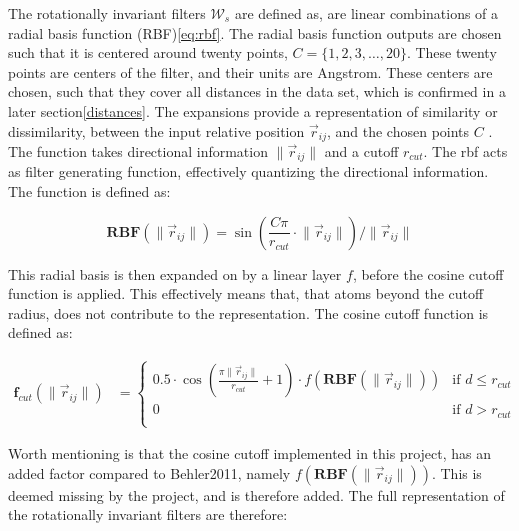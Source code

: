 The rotationally invariant filters $\mathcal{W}_{s}$ are defined as, are linear combinations of a radial basis function
(RBF)\ref{eq:rbf}\cite{Atz2021}. The radial basis function outputs are chosen such that it is centered around twenty
points, $ C = \{1, 2, 3, \ldots, 20\}$. These twenty points are centers of the filter, and their units are Angstrom.
These centers are chosen, such that they cover all distances in the data set, which is confirmed in a later section\ref{distances}.
The expansions provide a representation of similarity or dissimilarity, between the input relative position $\vec{r}_{ij}$,
and the chosen points $C$ \cite{rbf}.
The function takes directional information $\lVert \vec{r}_{ij} \rVert$ and a cutoff
$r_{cut}$. The rbf acts as filter generating function\cite{Schütt2017},
effectively quantizing the directional information. The function is defined as:

\begin{equation}\label{eq:rbf}
    \mathbf{RBF}(\lVert \vec{r}_{ij} \rVert) = \sin \left( \frac{C \pi}{r_{cut}} \cdot \lVert \vec{r}_{ij} \rVert  \right) / \lVert \vec{r}_{ij} \rVert
\end{equation}

This radial basis is then expanded on by a linear layer $f$, before the cosine cutoff function is applied. This effectively means that,
that atoms beyond the cutoff radius, does not contribute to the representation\cite{Behler2011}. The cosine cutoff function
is defined as:

\begin{equation}\label{eq:coscutoffproject}
    \begin{aligned}
        \mathbf{f}_{cut}(\lVert \vec{r}_{ij} \rVert) & =
        \begin{cases}
            0.5 \cdot \cos \left( \frac{\pi \lVert \vec{r}_{ij} \rVert}{r_{cut}} + 1  \right) \cdot f(\mathbf{RBF}(\lVert \vec{r}_{ij} \rVert)) & \text{if } d \leq r_{cut} \\
            0                                                                                                                                   & \text{if } d > r_{cut}    \\
        \end{cases}
    \end{aligned}
\end{equation}

Worth mentioning is that the cosine cutoff implemented in this project, has an added factor compared to Behler2011\cite{Behler2011}, namely
$f(\mathbf{RBF}(\lVert \vec{r}_{ij} \rVert))$. This is deemed missing by the project, and is therefore added. The full representation of
the rotationally invariant filters are therefore:

